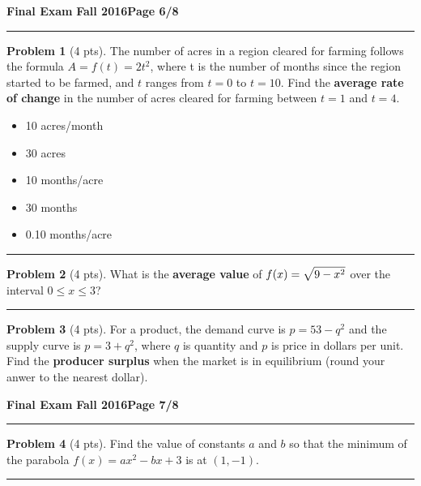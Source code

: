 \documentclass[12pt]{article}
\makeatletter
\theoremstyle{definition}
\newtheorem{problem}{Problem}
\newcommand*{\radiobutton}{%
  \@ifstar{\@radiobutton0}{\@radiobutton1}%
}
\newcommand*{\@radiobutton}[1]{%
  \begin{tikzpicture}
    \pgfmathsetlengthmacro\radius{height("X")/2}
    \draw[radius=\radius] circle;
    \ifcase#1 \fill[radius=.6*\radius] circle;\fi
  \end{tikzpicture}%
}
\makeatother
\begin{document}
\newpage

\hfill{\large\bf Final Exam}\hfill{\large\bf
  Fall 2016}\hfill{\large\bf Page 6/8}\hrule

\bigskip 

\begin{problem}[4 pts]
The number of acres in a region cleared for farming follows the formula $A = f (t) = 2t^2$, where t is the number of months since the region started to be farmed, and $t$ ranges from $t = 0$ to $t = 10$. Find the \textbf{average rate of change} in the number of acres cleared for farming between $t = 1$ and $t = 4$. 
\begin{itemize}
\item[\radiobutton] 10 acres/month
\item[\radiobutton] 30 acres
\item[\radiobutton] 10 months/acre
\item[\radiobutton] 30 months
\item[\radiobutton] 0.10 months/acre
\end{itemize}
\end{problem}

\hrule

\begin{problem}[4 pts]
What is the \textbf{average value} of $f(x) = \displaystyle{\sqrt{\vphantom{\lvert} 9-x^2}}$ over the interval $0 \leq x \leq 3$? 
\end{problem}
\vspace{4cm}
\hrule

\begin{problem}[4 pts]
For a product, the demand curve is $p=53-q^2$ and the supply curve is $p=3+q^2$, where $q$ is quantity and $p$ is price in dollars per unit. Find the \textbf{producer surplus} when the market is in equilibrium (round your anwer to the nearest dollar).
\end{problem}

\newpage

\hfill{\large\bf Final Exam}\hfill{\large\bf
  Fall 2016}\hfill{\large\bf Page 7/8}\hrule

\bigskip

\begin{problem}[4 pts]
Find the value of constants $a$ and $b$ so that the minimum of the parabola $f(x) = ax^2 -bx +3$ is at $(1,-1)$.

\vspace{5cm}
\end{problem}
\hrule
\end{document}

